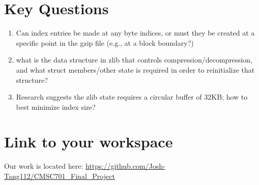 \documentclass[10pt]{article}
\begin{document}
\section{Key Questions}

\begin{enumerate}
\item Can index entries be made at any  byte indices, or must they be created at
    a specific point in the gzip file (e.g., at a block boundary?)
\item what is the data structure in zlib that controls
    compression/decompression, and what struct members/other state is required
        in order to reinitialize that structure?
\item Research suggests the zlib state requires a circular buffer of 32KB; how
    to best minimize index size?
\end{enumerate}

\section{Link to your workspace}

Our work is located here:
\url{https://github.com/Josh-Tang112/CMSC701_Final_Project}



\end{document}
